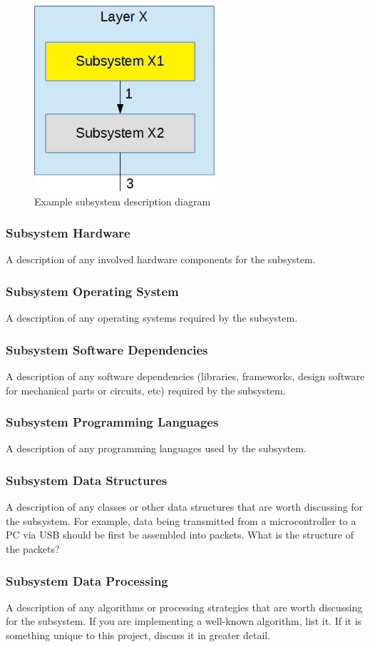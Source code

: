 \begin{figure}[h!]
	\centering
 	\includegraphics[width=0.60\textwidth]{images/subsystem}
 \caption{Example subsystem description diagram}
\end{figure}

\subsubsection{Subsystem Hardware}
A description of any involved hardware components for the subsystem.

\subsubsection{Subsystem Operating System}
A description of any operating systems required by the subsystem.

\subsubsection{Subsystem Software Dependencies}
A description of any software dependencies (libraries, frameworks, design software for mechanical parts or circuits, etc) required by the subsystem.

\subsubsection{Subsystem Programming Languages}
A description of any programming languages used by the subsystem.

\subsubsection{Subsystem Data Structures}
A description of any classes or other data structures that are worth discussing for the subsystem. For example, data being transmitted from a microcontroller to a PC via USB should be first be assembled into packets. What is the structure of the packets?

\subsubsection{Subsystem Data Processing}
A description of any algorithms or processing strategies that are worth discussing for the subsystem. If you are implementing a well-known algorithm, list it. If it is something unique to this project, discuss it in greater detail.


